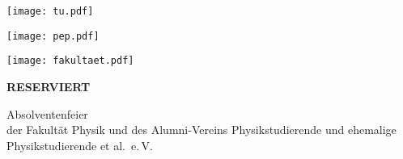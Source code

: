 \documentclass[paper=landscape]{scrartcl}
\begin{document}
\begin{minipage}{0.44\textwidth}%
  \texttt{[image: tu.pdf]}%
\end{minipage}%
\begin{minipage}{0.25\textwidth}%
  \centering
  \texttt{[image: pep.pdf]}%
\end{minipage}%
\begin{minipage}{0.29\textwidth}%
  \raggedleft%
  \texttt{[image: fakultaet.pdf]}%
\end{minipage}%

\vfill

\begin{center}
  \fontsize{120}{140}\selectfont\bfseries%
  RESERVIERT
\end{center}

\vfill

\begin{center}
  \huge Absolventenfeier\\
  der Fakultät Physik und des Alumni-Vereins
  Physikstudierende und ehemalige Physikstudierende et al.\ e.\,V.
\end{center}
  
\end{document}
